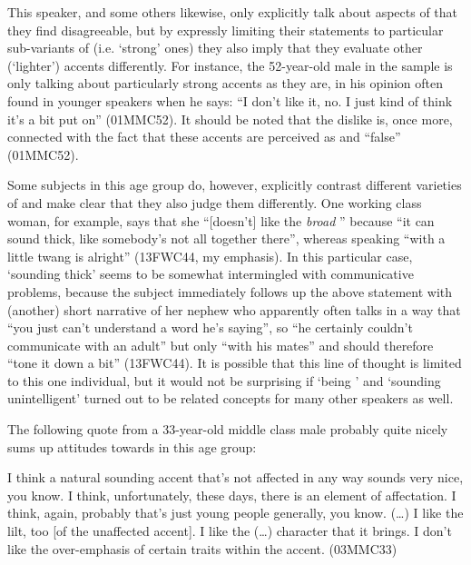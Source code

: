 This speaker, and some others likewise, only explicitly talk about aspects of  that they find disagreeable, but by expressly limiting their statements to particular sub-variants of  (i.e. `strong' ones) they also imply that they evaluate other (`lighter') accents differently.
For instance, the 52-year-old male in the sample is only talking about particularly strong  accents as they are, in his opinion often found in younger speakers when he says: ``I don't like it, no. I just kind of think it's a bit put on'' (01MMC52).
It should be noted that the dislike is, once more, connected with the fact that these accents are perceived as  and ``false'' (01MMC52).

Some subjects in this age group do, however, explicitly contrast different varieties of  and make clear that they also judge them differently.
One working class woman, for example, says that  she ``[doesn't] like the \emph{broad} '' because ``it can sound thick, like somebody's not all together there'', whereas speaking ``with a little twang is alright'' (13FWC44, my emphasis).
In this particular case, `sounding thick' seems to be somewhat intermingled with communicative problems, because the subject immediately follows up the above statement with (another) short narrative of her nephew who apparently often talks in a way that ``you just can't understand a word he's saying'', so ``he certainly couldn't communicate with an adult'' but only ``with his mates'' and should therefore ``tone it down a bit'' (13FWC44).
It is possible that this line of thought is limited to this one individual, but it would not be surprising if `being ' and `sounding unintelligent' turned out to be related concepts for many other speakers as well.

The following quote from a 33-year-old middle class male probably quite nicely sums up attitudes towards  in this age group:
\begin{example}
	I think a natural sounding  accent that's not affected in any way sounds very nice, you know.
	I think, unfortunately, these days, there is an element of affectation.
	I think, again, probably that's just young people generally, you know.
	(\ldots) I like the lilt, too [of the unaffected accent].
	I like the (\ldots) character that it brings.
	I don't like the over-emphasis of certain traits within the accent. (03MMC33)
\end{example}

